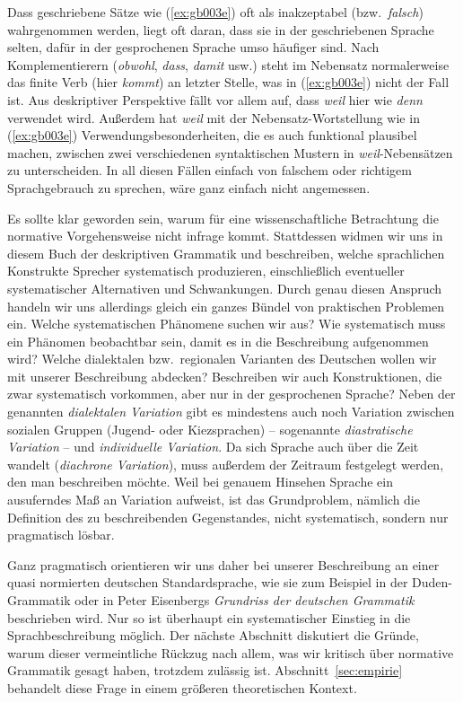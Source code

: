 Dass geschriebene Sätze wie (\ref{ex:gb003e}) oft als inakzeptabel (bzw.\ \textit{falsch}) wahrgenommen werden, liegt oft daran, dass sie in der geschriebenen Sprache selten, dafür in der gesprochenen Sprache umso häufiger sind.
Nach Komplementierern (\textit{obwohl}, \textit{dass}, \textit{damit} usw.) steht im Nebensatz normalerweise das finite Verb (hier \textit{kommt}) an letzter Stelle, was in (\ref{ex:gb003e}) nicht der Fall ist.
Aus deskriptiver Perspektive fällt vor allem auf, dass \textit{weil} hier wie \textit{denn} verwendet wird.
Außerdem hat \textit{weil} mit der Nebensatz-Wortstellung wie in (\ref{ex:gb003e}) Verwendungsbesonderheiten, die es auch funktional plausibel machen, zwischen zwei verschiedenen syntaktischen Mustern in \textit{weil}-Nebensätzen zu unterscheiden.
In all diesen Fällen einfach von falschem oder richtigem Sprachgebrauch zu sprechen, wäre ganz einfach nicht angemessen.

Es sollte klar geworden sein, warum für eine wissenschaftliche Betrachtung die normative Vorgehensweise nicht infrage kommt.
Stattdessen widmen wir uns in diesem Buch der deskriptiven Grammatik und beschreiben, welche sprachlichen Konstrukte Sprecher systematisch produzieren, einschließlich eventueller systematischer Alternativen und Schwankungen.
Durch genau diesen Anspruch handeln wir uns allerdings gleich ein ganzes Bündel von praktischen Problemen ein.
Welche systematischen Phänomene suchen wir aus?
Wie systematisch muss ein Phänomen beobachtbar sein, damit es in die Beschreibung aufgenommen wird?
Welche dialektalen bzw.\ regionalen Varianten des Deutschen wollen wir mit unserer Beschreibung abdecken?
Beschreiben wir auch Konstruktionen, die zwar systematisch vorkommen, aber nur in der gesprochenen Sprache?
Neben der genannten \textit{dialektalen Variation} gibt es mindestens auch noch Variation zwischen sozialen Gruppen (\zB Jugend- oder Kiezsprachen) -- sogenannte \textit{diastratische Variation} -- und \textit{individuelle Variation}.
Da sich Sprache auch über die Zeit wandelt (\textit{diachrone Variation}), muss außerdem der Zeitraum festgelegt werden, den man beschreiben möchte.
Weil bei genauem Hinsehen Sprache ein ausuferndes Maß an Variation aufweist, ist das Grundproblem, nämlich die Definition des zu beschreibenden Gegenstandes, nicht systematisch, sondern nur pragmatisch lösbar.
 
Ganz pragmatisch orientieren wir uns daher bei unserer Beschreibung an einer quasi normierten deutschen Standardsprache, wie sie zum Beispiel in der Duden-Grammatik \citep{Duden8} oder in Peter Eisenbergs \textit{Grundriss der deutschen Grammatik} \citep{Eisenberg1,Eisenberg2} beschrieben wird.
Nur so ist überhaupt ein systematischer Einstieg in die Sprachbeschreibung möglich.
Der nächste Abschnitt diskutiert die Gründe, warum dieser vermeintliche Rückzug nach allem, was wir kritisch über normative Grammatik gesagt haben, trotzdem zulässig ist.
Abschnitt~\ref{sec:empirie} behandelt diese Frage in einem größeren theoretischen Kontext.

